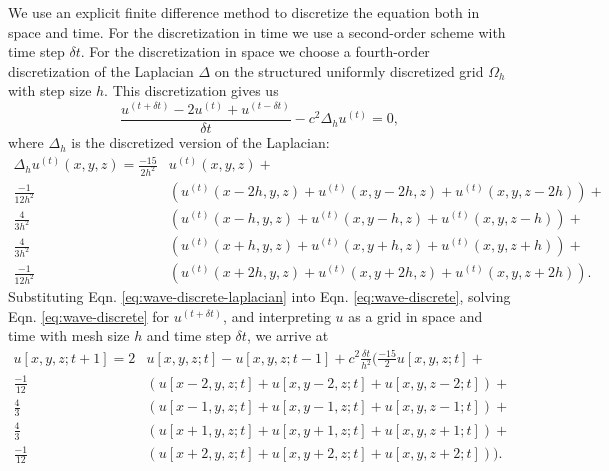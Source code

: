 We use an explicit finite difference method to discretize the equation both in space and time.
For the discretization in time we use a second-order scheme with time step $\delta t$.
For the discretization in space 
we choose a fourth-order discretization of the Laplacian $\Delta$ on the structured uniformly discretized grid
$\Omega_{h}$ with step size $h$. This discretization gives us
\begin{equation}
	\label{eq:wave-discrete}
	\frac{u^{(t+\delta t)}-2u^{(t)}+u^{(t-\delta t)}}{\delta t} - c^2 \Delta_h u^{(t)} = 0,
\end{equation}
where $\Delta_h$ is the discretized version of the Laplacian:
\begin{align}
	\label{eq:wave-discrete-laplacian}
	\Delta_h u^{(t)}(x,y,z) = \tfrac{-15}{2h^2} & u^{(t)}(x,y,z) + \\
                     \tfrac{-1}{12h^2} & \left(u^{(t)}(x-2h,y,z) + u^{(t)}(x,y-2h,z) + u^{(t)}(x,y,z-2h) \right) + \nonumber \\
                     \tfrac{4}{3h^2}   & \left(u^{(t)}(x-h,y,z)  + u^{(t)}(x,y-h,z)  + u^{(t)}(x,y,z-h)  \right) + \nonumber \\                     
                     \tfrac{4}{3h^2}   & \left(u^{(t)}(x+h,y,z)  + u^{(t)}(x,y+h,z)  + u^{(t)}(x,y,z+h)  \right) + \nonumber \\
                     \tfrac{-1}{12h^2} & \left(u^{(t)}(x+2h,y,z) + u^{(t)}(x,y+2h,z) + u^{(t)}(x,y,z+2h) \right). \nonumber
\end{align}
Substituting Eqn. \ref{eq:wave-discrete-laplacian} into Eqn. \ref{eq:wave-discrete},
solving Eqn. \ref{eq:wave-discrete} for $u^{(t+\delta t)}$, and interpreting $u$ as a grid in space and time with mesh size $h$
and time step $\delta t$, we arrive at
\begin{align*}
	u[x,y,z;t+1] =  2 & u[x,y,z;t] - u[x,y,z;t-1] + c^2\tfrac{\delta t}{h^2} \Big( \tfrac{-15}{2} u[x,y,z;t] + \\
	                \tfrac{-1}{12}& \left(u[x-2,y,z;t] + u[x,y-2,z;t] + u[x,y,z-2;t] \right) + \\
                    \tfrac{4}{3}  & \left(u[x-1,y,z;t] + u[x,y-1,z;t] + u[x,y,z-1;t] \right) + \\                     
                    \tfrac{4}{3}  & \left(u[x+1,y,z;t] + u[x,y+1,z;t] + u[x,y,z+1;t] \right) + \\
                    \tfrac{-1}{12}& \left(u[x+2,y,z;t] + u[x,y+2,z;t] + u[x,y,z+2;t] \right) \!\!\Big).
\end{align*}

